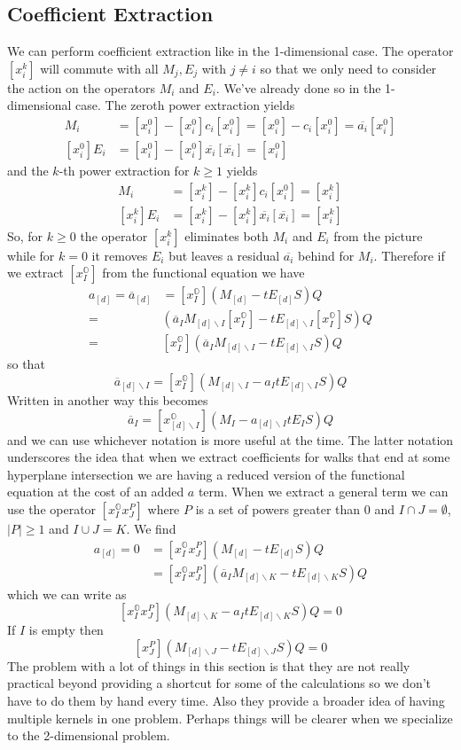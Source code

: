 \documentclass[12pt]{article}
\newcommand{\oo}{\mathbb{O}}
\theoremstyle{definition} \newtheorem{definition}[theorem]{Definition}
\newcommand{\ol}[1]{\overline{#1}}
\begin{document}
\subsection{Coefficient Extraction}
We can perform coefficient extraction like in the 1-dimensional case. The operator $[x_i^k]$ will commute with all $M_j, E_j$ with $j\neq i$ so that we only need to consider the action on the operators $M_i$ and $E_i$. We've already done so in the 1-dimensional case. The zeroth power extraction yields
\begin{align*}
	[x_i^0]M_i &= [x_i^0]-[x_i^0]c_i[x_i^0] = [x_i^0]-c_i[x_i^0] = \ol{a_i}[x_i^0]\\
	[x_i^0]E_i &= [x_i^0] - [x_i^0]\ol{x_i}[\ol{x_i}] = [x_i^0]
\end{align*}
and the $k$-th power extraction for $k\ge 1$ yields
\begin{align*}
	[x_i^k]M_i &= [x_i^k]-[x_i^k]c_i[x_i^0] = [x_i^k]\\
	[x_i^k]E_i &= [x_i^k] - [x_i^k]\ol{x_i}[\ol{x_i}] = [x_i^k]
\end{align*}
So, for $k\ge 0$ the operator $[x_i^k]$ eliminates both $M_i$ and $E_i$ from the picture while for $k = 0$ it removes $E_i$ but leaves a residual $\ol{a_i}$ behind for $M_i$. Therefore if we extract $[x_I^\oo]$ from the functional equation we have
\begin{align*}
	[x_I^\oo]a_{[d]} =\ol{a}_{[d]} &= [x_I^\oo](M_{[d]} - tE_{[d]}S)Q \\
	= &\left(\ol{a}_{I}M_{[d]\backslash I}[x_I^\oo] - tE_{[d]\backslash I}[x_I^\oo]S\right)Q\\
	= &[x_I^\oo](\ol{a}_{I}M_{[d]\backslash I}- tE_{[d]\backslash I}S)Q
\end{align*}
so that
\[
	\ol{a}_{[d]\backslash I} = [x_I^\oo](M_{[d]\backslash I}- a_{I}tE_{[d]\backslash I}S)Q
\]
Written in another way this becomes
\[
	\ol{a}_I = [x_{[d]\backslash I}^\oo](M_I - a_{[d]\backslash I} tE_I S)Q
\]
and we can use whichever notation is more useful at the time. The latter notation underscores the idea that when we extract coefficients for walks that end at some hyperplane intersection we are having a reduced version of the functional equation at the cost of an added $a$ term. When we extract a general term we can use the operator $[x_I^\oo x_J^P]$ where $P$ is a set of powers greater than 0 and $I\cap J = \emptyset$, $|P| \ge 1$ and $I\cup J = K$. We find
\begin{align*}
	 [x_I^\oo x_J^P] a_{[d]} = 0 &= [x_I^\oo x_J^P](M_{[d]} - tE_{[d]}S)Q \\
	 &= [x_I^\oo x_J^P](\ol{a}_{I} M_{[d]\backslash K} - t E_{[d]\backslash K} S)Q
\end{align*}
which we can write as
\[
	[x_I^\oo x_J^P]( M_{[d]\backslash K} - a_I t E_{[d]\backslash K} S)Q = 0
\]
If $I$ is empty then
\[
	[x_J^P]( M_{[d]\backslash J} - t E_{[d]\backslash J} S)Q = 0
\]
The problem with a lot of things in this section is that they are not really practical beyond providing a shortcut for some of the calculations so we don't have to do them by hand every time. Also they provide a broader idea of having multiple kernels in one problem. Perhaps things will be clearer when we specialize to the 2-dimensional problem.
\end{document}
